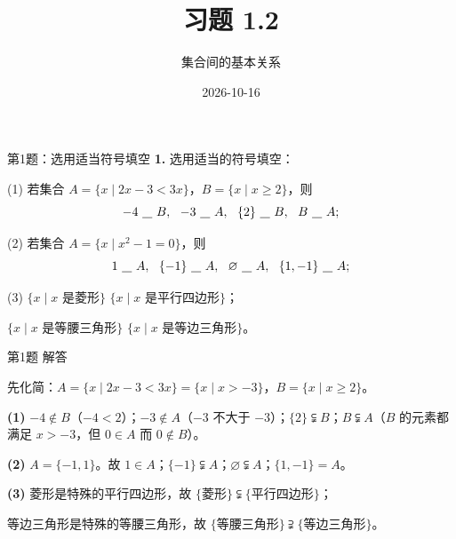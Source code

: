 \documentclass[10pt,aspectratio=169,serif]{beamer}
\title[习题1.2]{习题 1.2}
\subtitle{集合间的基本关系}
\author{}
\institute{}
\date{2026-10-16}
\begin{document}
\begin{frame}
  \titlepage
\end{frame}

\begin{frame}[t]{第1题：选用适当符号填空}
\textbf{1.} 选用适当的符号填空：

\vspace{0.4em}
(1) 若集合 $A = \{x \mid 2x - 3 < 3x\}$，$B = \{x \mid x \ge 2\}$，则
\[
-4\ \underline{\hspace{0.8em}}\ B,\ \ -3\ \underline{\hspace{0.8em}}\ A,\ \ \{2\}\ \underline{\hspace{0.8em}}\ B,\ \ B\ \underline{\hspace{0.8em}}\ A;
\]

(2) 若集合 $A = \{x \mid x^2 - 1 = 0\}$，则
\[
1\ \underline{\hspace{0.8em}}\ A,\ \ \{-1\}\ \underline{\hspace{0.8em}}\ A,\ \ \varnothing\ \underline{\hspace{0.8em}}\ A,\ \ \{1,-1\}\ \underline{\hspace{0.8em}}\ A;
\]

(3) $\{x \mid x \text{ 是菱形}\}$ \underline{\hspace{0.8em}} $\{x \mid x \text{ 是平行四边形}\}$；

\qquad $\{x \mid x \text{ 是等腰三角形}\}$ \underline{\hspace{0.8em}} $\{x \mid x \text{ 是等边三角形}\}$。
\end{frame}

\begin{frame}[t]{第1题 解答}
\begin{tcolorbox}[colback=orange!10,colframe=orange,title=\textbf{解}]
先化简：$A = \{x \mid 2x-3 < 3x\} = \{x \mid x > -3\}$，$B = \{x \mid x \ge 2\}$。

\vspace{0.3em}
\textbf{(1)} $-4 \notin B$（$-4 < 2$）；$-3 \notin A$（$-3$ 不大于 $-3$）；$\{2\} \subsetneqq B$；$B \subsetneqq A$（$B$ 的元素都满足 $x>-3$，但 $0 \in A$ 而 $0 \notin B$）。

\vspace{0.3em}
\textbf{(2)} $A = \{-1, 1\}$。故 $1 \in A$；$\{-1\} \subsetneqq A$；$\varnothing \subsetneqq A$；$\{1,-1\} = A$。

\vspace{0.3em}
\textbf{(3)} 菱形是特殊的平行四边形，故 $\{$菱形$\} \subsetneqq \{$平行四边形$\}$；

等边三角形是特殊的等腰三角形，故 $\{$等腰三角形$\} \supsetneqq \{$等边三角形$\}$。
\end{tcolorbox}
\end{frame}
\end{document}
